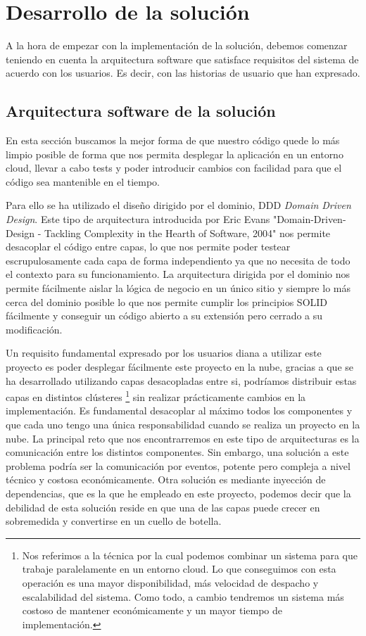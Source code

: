 \chapter{Desarrollo de la solución}
A la hora de empezar con la implementación de la solución, debemos comenzar teniendo en
cuenta la arquitectura software que satisface requisitos del sistema de acuerdo con los
usuarios. Es decir, con las historias de usuario que han expresado.

\section{Arquitectura software de la solución}
En esta sección buscamos la mejor forma de que nuestro código quede lo más limpio posible
de forma que nos permita desplegar la aplicación en un entorno cloud, llevar a cabo tests
y poder introducir cambios con facilidad para que el código sea mantenible en el tiempo.

Para ello se ha utilizado el diseño dirigido por el dominio, DDD \textit{Domain Driven
Design}. Este tipo de arquitectura introducida por Eric Evans \cite{ddd_book}
"Domain-Driven-Design - Tackling Complexity in the Hearth of Software, 2004" nos permite
desacoplar el código entre capas, lo que nos permite poder testear escrupulosamente cada
capa de forma independiento ya que no necesita de todo el contexto para su funcionamiento.
La arquitectura dirigida por el dominio nos permite fácilmente aislar la lógica de negocio
en un único sitio y siempre lo más cerca del dominio posible lo que nos permite cumplir
los principios \Gls{SOLID} fácilmente y conseguir un código abierto a su extensión pero
cerrado a su modificación.  


Un requisito fundamental expresado por los usuarios diana a utilizar este proyecto es
poder desplegar fácilmente este proyecto en la nube, gracias a que se ha desarrollado
utilizando capas desacopladas entre si, podríamos distribuir estas capas en distintos
clústeres \footnote{Nos referimos a la técnica por la cual podemos combinar un sistema
para que trabaje paralelamente en un entorno cloud. Lo que conseguimos con esta operación
es una mayor disponibilidad, más velocidad de despacho y escalabilidad del sistema. Como
todo, a cambio tendremos un sistema más costoso de mantener económicamente y un mayor
tiempo de implementación. } sin realizar prácticamente cambios en la implementación.  Es
fundamental desacoplar al máximo todos los componentes y que cada uno tengo una única
responsabilidad cuando se realiza un proyecto en la nube. La principal reto que nos
encontrarremos en este tipo de arquitecturas es la comunicación entre los distintos
componentes.  Sin embargo, una solución a este problema podría ser la comunicación por
eventos, potente pero compleja a nivel técnico y costosa económicamente. Otra solución es
mediante inyección de dependencias, que es la que he empleado en este proyecto, podemos
decir que la debilidad de esta solución reside en que una de las capas puede crecer en
sobremedida y convertirse en un cuello de botella.

